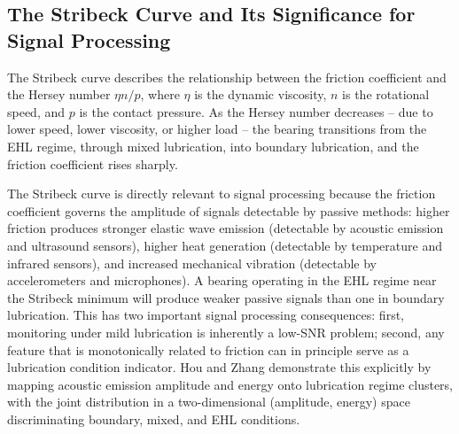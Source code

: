 \subsection{The Stribeck Curve and Its Significance for Signal Processing}
\label{subsec:stribeck}
The Stribeck curve describes the relationship between the friction coefficient and the Hersey number $\eta n / p$, where $\eta$ is the dynamic viscosity, $n$ is the rotational speed, and $p$ is the contact pressure. As the Hersey number decreases -- due to lower speed, lower viscosity, or higher load -- the bearing transitions from the EHL regime, through mixed lubrication, into boundary lubrication, and the friction coefficient rises sharply.

The Stribeck curve is directly relevant to signal processing because the friction coefficient governs the amplitude of signals detectable by passive methods: higher friction produces stronger elastic wave emission (detectable by acoustic emission and ultrasound sensors), higher heat generation (detectable by temperature and infrared sensors), and increased mechanical vibration (detectable by accelerometers and microphones). A bearing operating in the EHL regime near the Stribeck minimum will produce weaker passive signals than one in boundary lubrication. This has two important signal processing consequences: first, monitoring under mild lubrication is inherently a low-SNR problem; second, any feature that is monotonically related to friction can in principle serve as a lubrication condition indicator. Hou and Zhang \cite{hou_-situ_2025} demonstrate this explicitly by mapping acoustic emission amplitude and energy onto lubrication regime clusters, with the joint distribution in a two-dimensional (amplitude, energy) space discriminating boundary, mixed, and EHL conditions.

